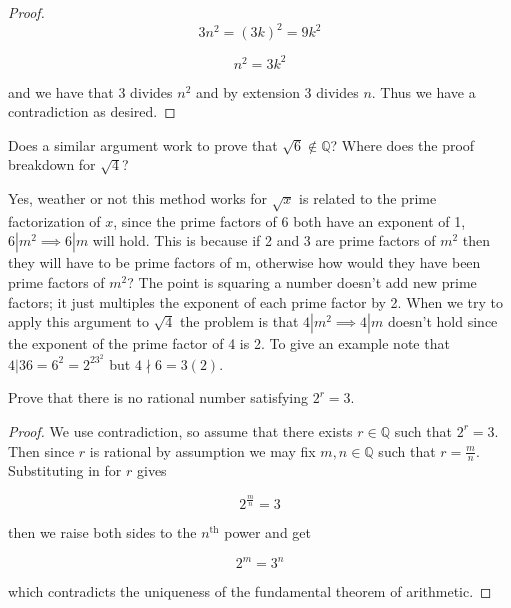 \documentclass[11pt,largemargins]{homework}
\newcommand{\Q}{\mathbb{Q}}
\begin{document}
\begin{alphaparts}
\begin{proof}
                \begin{equation}
                     3n^2 = (3k)^2 = 9k^2
                \end{equation}
                
                \begin{equation}
                     n^2 = 3k^2 
                \end{equation}
                
                and we have that 3 divides $n^2$ and by extension 3 divides $n$. Thus we have a contradiction as desired.  
            \end{proof}
        \questionpart
            Does a similar argument work to prove that $\sqrt{6} \notin \Q$? Where does the proof breakdown for $\sqrt{4}$?
            
                Yes, weather or not this method works for $\sqrt{x}$ is related to the prime factorization of $x$, since the prime factors of 6 both have an exponent of 1, $6|m^2 \implies 6|m$ will hold. This is because if 2 and 3 are prime factors of $m^2$ then they will have to be prime factors of m, otherwise how would they have been prime factors of $m^2$? The point is squaring a number doesn't add new prime factors; it just multiples the exponent of each prime factor by 2. When we try to apply this argument to $\sqrt{4}$ the problem is that $4|m^2 \implies 4|m$ doesn't hold since the exponent of the prime factor of 4 is 2. To give an example note that $4|36 = 6^2 = 2^23^2$ but $4\nmid 6 = 3 (2) $. 
    \end{alphaparts}
    
    \question
    Prove that there is no rational number satisfying $2^r = 3$. 
    
    \begin{proof}
    We use contradiction, so assume that there exists $r \in \Q$ such that $2^r = 3$. Then since $r$ is rational by assumption we may fix $m, n \in \Q$ such that $r = \frac{m}{n}$. Substituting in for $r$ gives
    
    \[ 2^{\frac{m}{n}}  = 3\] 
    
    then we raise both sides to the $n^{\text{th}}$ power and get 
    
    \[ 2^m = 3^n \] 
    
    which contradicts the uniqueness of the fundamental theorem of arithmetic. 
    \end{proof}
\end{document}
